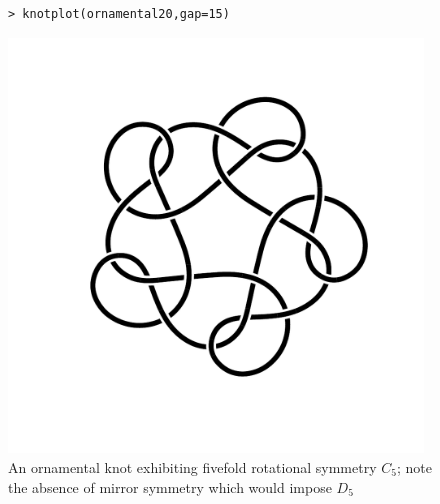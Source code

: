 \documentclass{birkjour}
\theoremstyle{definition}
\theoremstyle{remark}
\numberwithin{equation}{section}
\begin{document}
\begin{figure}[htbp]
  \begin{center}
\begin{verbatim}
> knotplot(ornamental20,gap=15)
\end{verbatim}
\includegraphics[width=11cm]{knot-ornamental} %
\caption{An ornamental knot exhibiting fivefold
  rotational \label{orn20} symmetry $C_5$; note the absence of mirror
  symmetry which would impose $D_5$}
  \end{center}
\end{figure}
\end{document}
